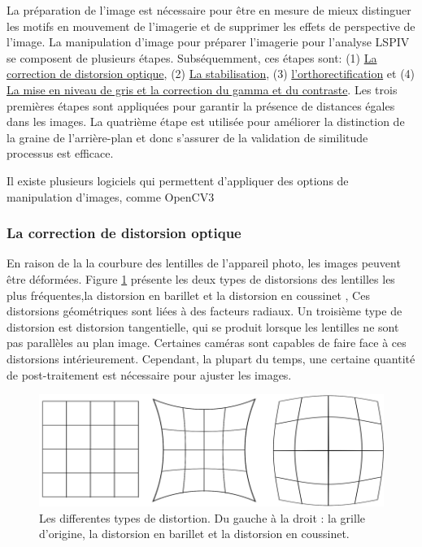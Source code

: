 \documentclass[
]{article}
\begin{document}
La préparation de l'image est nécessaire pour être en mesure de mieux distinguer les motifs en mouvement de l'imagerie et de supprimer les effets de perspective de l'image. La manipulation d'image pour préparer l'imagerie pour l'analyse LSPIV se composent de plusieurs étapes. Subséquemment, ces étapes sont:
(1) \protect\hyperlink{la-correction-de-distorsion-optique}{La correction de distorsion optique}, (2) \protect\hyperlink{la-stabilisation}{La stabilisation}, (3) \protect\hyperlink{lorthorectification-dimage}{l'orthorectification} et
(4) \protect\hyperlink{la-mise-en-niveau-de-gris-et-la-correction-du-gamma-et-du-contraste}{La mise en niveau de gris et la correction du gamma et du contraste}. Les trois premières étapes
sont appliquées pour garantir la présence de distances égales dans les images.
La quatrième étape est utilisée pour améliorer la distinction de la graine de
l'arrière-plan et donc s'assurer de la validation de similitude
processus est efficace.

Il existe plusieurs logiciels qui permettent d'appliquer des options de manipulation d'images, comme OpenCV3\citep{noauthor_opencv_2015}

\hypertarget{la-correction-de-distorsion-optique}{%
\subsubsection*{La correction de distorsion optique}\label{la-correction-de-distorsion-optique}}

En raison de la la courbure des lentilles de l'appareil photo, les images peuvent être déformées. Figure \ref{fig:flens} présente les deux types de distorsions des lentilles les plus fréquentes,la distorsion en barillet et la distorsion en coussinet \citep{fryer_lens_1986} , Ces distorsions géométriques sont liées à des facteurs radiaux. Un troisième type de distorsion est distorsion tangentielle, qui se produit lorsque les lentilles ne sont pas parallèles au plan
image. Certaines caméras sont capables de faire face à ces distorsions
intérieurement. Cependant, la plupart du temps, une certaine quantité de post-traitement est
nécessaire pour ajuster les images.



\begin{figure}
\includegraphics[width=1\linewidth]{images/lens} \caption{Les differentes types de distortion. Du gauche à la droit : la grille d'origine, la distorsion en barillet et la distorsion en coussinet.}\label{fig:flens}
\end{figure}
\end{document}
